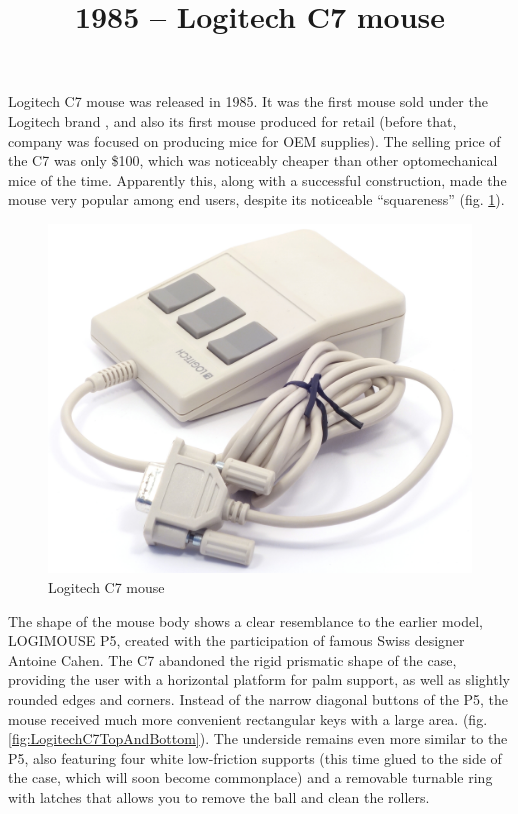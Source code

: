 \documentclass[11pt, a4paper]{article}
\begin{document}
\title{1985 -- Logitech C7 mouse}
\date{}
\maketitle
{}
Logitech C7 mouse was released in 1985. It was the first mouse sold under the Logitech brand \cite{timeline}, and also its first mouse produced for retail (before that, company was focused on producing mice for OEM supplies).
The selling price of the C7 was only \$100, which was noticeably cheaper than other optomechanical mice of the time. Apparently this, along with a successful construction, made the mouse very popular among end users, despite its noticeable “squareness” (fig. \ref{fig:LogitechC7Pic}).

\begin{figure}[h]
   \centering
    \includegraphics[scale=0.5]{1985_logitech_c7_mouse/pic_60.jpg}
    \caption{Logitech C7 mouse}
    \label{fig:LogitechC7Pic}
\end{figure}

The shape of the mouse body shows a clear resemblance to the earlier model, LOGIMOUSE P5, created with the participation of famous Swiss designer Antoine Cahen. The C7 abandoned the rigid prismatic shape of the case, providing the user with a horizontal platform for palm support, as well as slightly rounded edges and corners. Instead of the narrow diagonal buttons of the P5, the mouse received much more convenient rectangular keys with a large area. (fig. \ref{fig:LogitechC7TopAndBottom}). The underside remains even more similar to the P5, also featuring four white low-friction supports (this time glued to the side of the case, which will soon become commonplace) and a removable turnable ring with latches that allows you to remove the ball and clean the rollers.
\end{document}
